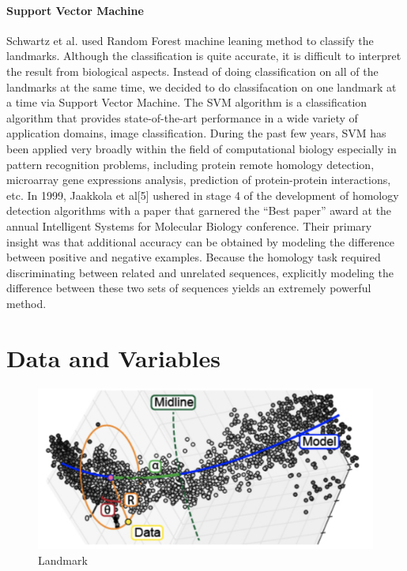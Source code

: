 \documentclass[10pt,letterpaper]{article}
\begin{document}
\paragraph{Support Vector Machine}\label{support-vector-machine}

Schwartz et al. used Random Forest machine leaning method to classify
the landmarks. Although the classification is quite accurate, it is
difficult to interpret the result from biological aspects. Instead of
doing classification on all of the landmarks at the same time, we
decided to do classifacation on one landmark at a time via Support
Vector Machine. The SVM algorithm is a classification algorithm that
provides state-of-the-art performance in a wide variety of application
domains, image classification. During the past few years, SVM has been
applied very broadly within the field of computational biology
especially in pattern recognition problems, including protein remote
homology detection, microarray gene expressions analysis, prediction of
protein-protein interactions, etc. In 1999, Jaakkola et al{[}5{]}
ushered in stage 4 of the development of homology detection algorithms
with a paper that garnered the ``Best paper'' award at the annual
Intelligent Systems for Molecular Biology conference. Their primary
insight was that additional accuracy can be obtained by modeling the
difference between positive and negative examples. Because the homology
task required discriminating between related and unrelated sequences,
explicitly modeling the difference between these two sets of sequences
yields an extremely powerful method.

\section{Data and Variables}\label{data-and-variables}

\begin{figure}[h]

{\centering \includegraphics[width=5.55in]{figures/landmark} 

}

\caption{Landmark}\label{fig:landmark}
\end{figure}
\end{document}

